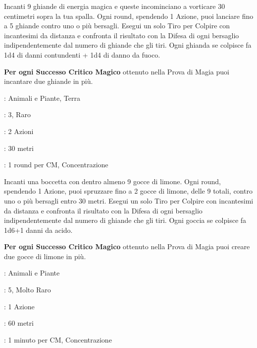 \begin{multicols}{2}
Incanti 9 ghiande di energia magica e queste incominciano a vorticare 30 centimetri sopra la tua spalla.
Ogni round, spendendo 1 Azione, puoi lanciare fino a 5 ghiande contro uno o più bersagli.
Esegui un solo Tiro per Colpire con incantesimi da distanza e confronta il risultato con la Difesa di ogni bersaglio indipendentemente dal numero di ghiande che gli tiri. Ogni ghianda se colpisce fa 1d4 di danni contundenti + 1d4 di danno da fuoco.

\textbf{Per ogni Successo Critico Magico} ottenuto nella Prova di Magia puoi incantare due ghiande in più.

\noindent\colorbox{OBSSgold!10}{
\begin{minipage}{0.95\linewidth}
\begin{description}[noitemsep, topsep=0pt, parsep=0pt, partopsep=0pt, leftmargin=0cm, labelwidth=1.3cm]
	\item[\textbf{Lista}]: Animali e Piante, Terra
	\item[\textbf{Livello}]: 3, Raro
	\item[\textbf{Lancio}]: 2 Azioni
	\item[\textbf{Gittata}]: 30 metri
	\item[\textbf{Durata}]: 1 round per CM, Concentrazione
\end{description}
\end{minipage}}\smallskip

Incanti una boccetta con dentro almeno 9 gocce di limone.
Ogni round, spendendo 1 Azione, puoi spruzzare fino a 2 gocce di limone, delle 9 totali, contro uno o più bersagli entro 30 metri.
Esegui un solo Tiro per Colpire con incantesimi da distanza e confronta il risultato con la Difesa di ogni bersaglio indipendentemente dal numero di ghiande che gli tiri. Ogni goccia se colpisce fa 1d6+1 danni da acido.

\textbf{Per ogni Successo Critico Magico} ottenuto nella Prova di Magia puoi creare due gocce di limone in più.

\noindent\colorbox{OBSSgold!10}{
\begin{minipage}{0.95\linewidth}
\begin{description}[noitemsep, topsep=0pt, parsep=0pt, partopsep=0pt, leftmargin=0cm, labelwidth=1.3cm]
	\item[\textbf{Lista}]: Animali e Piante
	\item[\textbf{Livello}]: 5, Molto Raro
	\item[\textbf{Lancio}]: 1 Azione
	\item[\textbf{Gittata}]: 60 metri
	\item[\textbf{Durata}]: 1 minuto per CM, Concentrazione
\end{description}
\end{minipage}}\smallskip


\end{multicols}
